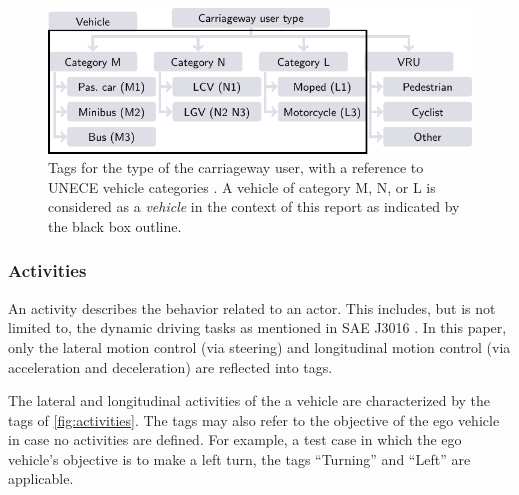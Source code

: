 \begin{figure}[t]
	\centering
	\includegraphics{figures/actor_type}
	\caption{Tags for the type of the carriageway user, with a reference to UNECE vehicle categories \autocite{UNECE2011consolidated}. %
		A vehicle of category M, N, or L is considered as a \emph{vehicle} in the context of this report as indicated by the black box outline. 
	}
	\label{fig:tree carriageway user type}
\end{figure}



\subsubsection{Activities}
\label{sec:activities}

An activity describes the behavior related to an actor. This includes, but is not limited to, the dynamic driving tasks as mentioned in SAE J3016 \cite{sae2018j3016}. In this paper, only the lateral motion control (via steering) and longitudinal motion control (via acceleration and deceleration) are reflected into tags.

The lateral and longitudinal activities of the a vehicle are characterized by the tags of \cref{fig:activities}. The tags may also refer to the objective of the ego vehicle in case no activities are defined. For example, a test case in which the ego vehicle's objective is to make a left turn, the tags ``Turning'' and ``Left'' are applicable. 

